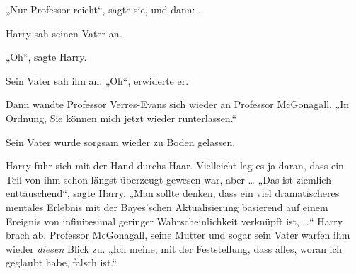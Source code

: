 „Nur Professor reicht“, sagte sie, und dann: .

Harry sah seinen Vater an.

„Oh“, sagte Harry.

Sein Vater sah ihn an.
„Oh“, erwiderte er.

Dann wandte Professor Verres-Evans sich wieder an Professor McGonagall.
„In Ordnung, Sie können mich jetzt wieder runterlassen.“

Sein Vater wurde sorgsam wieder zu Boden gelassen.

Harry fuhr sich mit der Hand durchs Haar. Vielleicht lag es ja daran, dass ein Teil von ihm schon längst überzeugt gewesen war, aber …
„Das ist ziemlich enttäuschend“, sagte Harry.
„Man sollte denken, dass ein viel dramatischeres mentales Erlebnis mit der Bayes’schen Aktualisierung basierend auf einem Ereignis von infinitesimal geringer Wahrscheinlichkeit verknüpft ist, …“ Harry brach ab. Professor McGonagall, seine Mutter und sogar sein Vater warfen ihm wieder \emph{diesen} Blick zu.
„Ich meine, mit der Feststellung, dass alles, woran ich geglaubt habe, falsch ist.“

